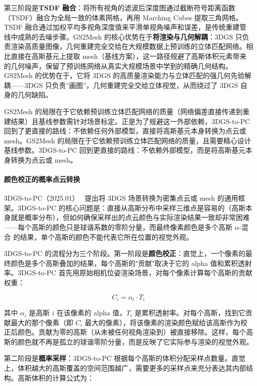 第三阶段是\textbf{TSDF 融合}：将所有视角的滤波后深度图通过截断符号距离函数（TSDF）融合为全局一致的体素网格，再用 Marching Cubes 提取三角网格。TSDF 融合通过加权平均多视角深度值来平滑单视角噪声和误差，是传统重建管线中成熟的去噪步骤。GS2Mesh 的核心优势在于\textbf{将渲染与几何解耦}：3DGS 只负责渲染高质量图像，几何重建完全交给在大规模数据上预训练的立体匹配网络。相比直接在高斯基元上提取 mesh（基线方案），这一路径规避了高斯体积元素带来的几何噪声，保留了预训练网络从真实大规模场景中学到的精确几何结构。GS2Mesh 的优势在于，它将 3DGS 的高质量渲染能力与立体匹配的强几何先验解耦——3DGS 只负责”画图”，几何重建完全交给立体视觉，从而绕过了 3DGS 自身的几何缺陷。

GS2Mesh 的局限在于它依赖预训练立体匹配网络的质量（网络偏差直接传递到重建结果）且基线参数需针对场景标定。正是为了规避这一外部依赖，3DGS-to-PC 回到了更直接的路线：不依赖任何外部模型，直接将高斯基元本身转换为点云或 mesh。GS2Mesh 的局限在于它依赖预训练立体匹配网络的质量，且需要精心设计基线参数。3DGS-to-PC 回到更直接的路线：不依赖外部模型，而是将高斯基元本身转换为点云或 mesh。

\paragraph{颜色校正的概率点云转换}

3DGS-to-PC（2025.01）~\cite{2501_07478} 提出将 3DGS 场景转换为密集点云或 mesh 的通用框架。3DGS-to-PC 的核心问题是：直接从高斯分布中采样三维点是容易的（高斯本身就是概率分布），但如何确保采样出的点云颜色与实际渲染结果一致却非常困难——每个高斯的颜色只是球谐系数的零阶分量，而最终像素颜色是多个高斯 $\alpha$-混合 的结果，单个高斯的颜色不能代表它所在位置的视觉外观。

3DGS-to-PC 的流程分为三个阶段。第一阶段是\textbf{颜色校正}：直觉上，一个像素的最终颜色是多个高斯叠加的结果，每个高斯的"贡献"取决于它的 alpha 值和累积透射率。3DGS-to-PC 首先用原始相机位姿渲染场景，对每个像素计算每个高斯的贡献权重：

\begin{equation}
C_i = \alpha_i \cdot T_i
\end{equation}

其中 $\alpha_i$ 是高斯 $i$ 在该像素的 alpha 值，$T_i$ 是累积透射率。对每个高斯，找到它贡献最大的那个像素（即 $C_i$ 最大的像素），将该像素的渲染颜色赋给该高斯作为校正后颜色。贡献为零的高斯（从未被任何视角渲染到）被直接移除。这样，每个高斯的颜色就不再是孤立的球谐零阶分量，而是反映了它实际参与渲染的视觉外观。

第二阶段是\textbf{概率采样}：3DGS-to-PC 根据每个高斯的体积分配采样点数量。直觉上，体积越大的高斯覆盖的空间范围越广，需要更多的采样点来充分表达其内部结构。高斯体积的计算公式为：

